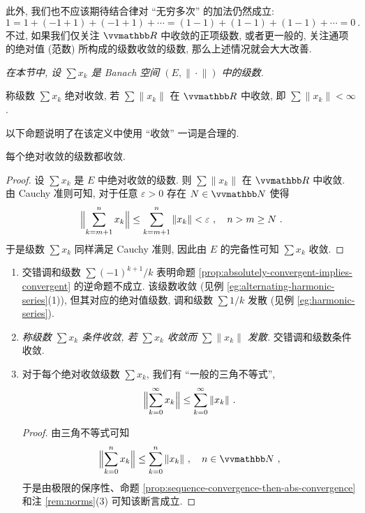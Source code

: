 此外, 我们也不应该期待结合律对 ``无穷多次'' 的加法仍然成立:
\[
    1 = 1 + (- 1 + 1) + (- 1 + 1) + \cdots = (1 - 1) + (1 - 1) + (1 - 1) + \cdots = 0\ .
\]
不过, 如果我们仅关注 \(\R\) 中收敛的正项级数, 或者更一般的, 关注通项的绝对值 (范数) 所构成的级数收敛的级数, 那么上述情况就会大大改善.

\begin{center}
    \textsl{在本节中, 设 \(\sum x_k\) 是 Banach 空间 \((E, \|\!\cdot\!\|)\) 中的级数.}
\end{center}

\begin{definition}[绝对收敛]
    称级数 \(\sum x_k\) 绝对收敛, 若 \(\sum \|x_k\|\) 在 \(\R\) 中收敛, 即 \(\sum \|x_k\| < \infty\).
\end{definition}

以下命题说明了在该定义中使用 ``收敛'' 一词是合理的.

\begin{proposition}\label{prop:absolutely-convergent-implies-convergent}
    每个绝对收敛的级数都收敛.
\end{proposition}

\begin{proof}
    设 \(\sum x_k\) 是 \(E\) 中绝对收敛的级数. 则 \(\sum \|x_k\|\) 在 \(\R\) 中收敛. 由 Cauchy 准则可知, 对于任意 \(\varepsilon > 0\) 存在 \(N \in \N\) 使得
    \[
        \Bigl\| \sum_{k = m + 1}^n x_k \Bigr\| \leq \sum_{k = m + 1}^n \|x_k\| < \varepsilon\ ,\quad n > m \geq N\ .
    \]
    于是级数 \(\sum x_k\) 同样满足 Cauchy 准则, 因此由 \(E\) 的完备性可知 \(\sum x_k\) 收敛.
\end{proof}

\begin{remark}\label{rem:absolutely-and-conditionally-convergent}
    \begin{enumerate}
        \item 交错调和级数 \(\sum (- 1)^{k + 1} / k\) 表明命题 \ref{prop:absolutely-convergent-implies-convergent} 的逆命题不成立. 该级数收敛 (见例 \ref{eg:alternating-harmonic-series}(1)), 但其对应的绝对值级数, 调和级数 \(\sum 1 / k\) 发散 (见例 \ref{eg:harmonic-series}).
        \item \textsl{称级数 \(\sum x_k\) 条件收敛, 若 \(\sum x_k\) 收敛而 \(\sum \|x_k\|\) 发散.} 交错调和级数条件收敛.
        \item 对于每个绝对收敛级数 \(\sum x_k\), 我们有 ``一般的三角不等式'',
        \[
            \Bigl\| \sum_{k = 0}^\infty x_k \Bigr\| \leq \sum_{k = 0}^\infty \|x_k\|\ .
        \]
        \begin{proof}
            由三角不等式可知
            \[
                \Bigl\| \sum_{k = 0}^n x_k \Bigr\| \leq \sum_{k = 0}^n \|x_k\|\ ,\quad n \in \N\ ,
            \]
            于是由极限的保序性、命题 \ref{prop:sequence-convergence-then-abs-convergence} 和注 \ref{rem:norms}(3) 可知该断言成立.
        \end{proof}
    \end{enumerate}
\end{remark}

